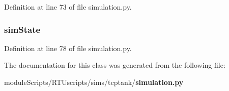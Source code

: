 Definition at line 73 of file simulation.\+py.

\subsubsection[{sim\+State}]{\setlength{\rightskip}{0pt plus 5cm}sim\+State}\label{classsims_1_1tcptank_1_1simulation_1_1_simulation_a41f89dc1173ec57bbed0975711b48c36}


Definition at line 78 of file simulation.\+py.



The documentation for this class was generated from the following file\+:\begin{DoxyCompactItemize}
\item 
module\+Scripts/\+R\+T\+Uscripts/sims/tcptank/{\bf simulation.\+py}\end{DoxyCompactItemize}
